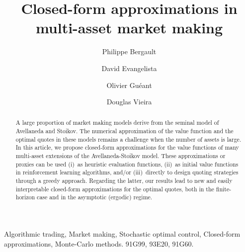 \documentclass[preprint, 3p]{elsarticle}
\newcommand{\1}{{\chi}}
\begin{document}
	
\begin{frontmatter}
	
\title{Closed-form approximations in multi-asset market making}


\author[UParis1]{Philippe Bergault}
\address[UParis1]{Universit\'e  Paris 1 Panthéon-Sorbonne, Centre d'Economie de la Sorbonne, 106 Boulevard de l'H\^opital, 75642 Paris Cedex~13, France.}



\author[FGV]{David Evangelista}

\address[FGV]{Escola de Matem\'atica Aplicada, Funda\c c\~ao Get\'ulio Vargas, Rio de Janeiro, RJ, Brasil.}

\author[UParis1]{Olivier Gu\'eant}


\author[ICL]{Douglas Vieira}
\address[ICL]{Imperial College London, Department of Mathematics,
London SW7 2AZ, UK.}

	
\date{}
\journal{ }
	
	
\begin{abstract}
A large proportion of market making models derive from the seminal model of Avellaneda and Stoikov. The numerical approximation of the value function and the optimal quotes in these models remains a challenge when the number of assets is large. In this article, we propose closed-form approximations for the value functions of many multi-asset extensions of the Avellaneda-Stoikov model. These approximations or proxies can be used (i)~as heuristic evaluation functions, (ii)~as initial value functions in reinforcement learning algorithms, and/or (iii)~directly to design quoting strategies through a greedy approach. Regarding the latter, our results lead to new and easily interpretable closed-form approximations for the optimal quotes, both in the finite-horizon case and in the asymptotic (ergodic) regime.
\end{abstract}

\begin{keyword}
Algorithmic trading, Market making, Stochastic optimal control, Closed-form approximations, Monte-Carlo methods.
\MSC[2010] 91G99, 93E20, 91G60.
\end{keyword}

\end{frontmatter}	
\setlength\parindent{0pt}
\end{document}
